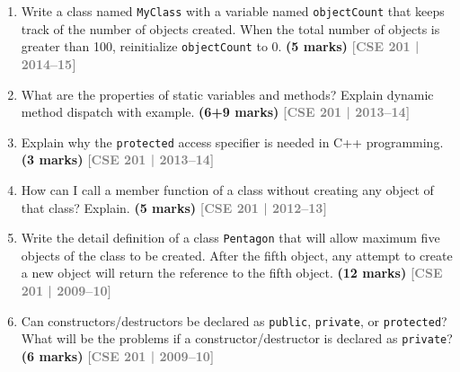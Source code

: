 \documentclass[12pt,a3paper]{article}
\newcommand{\yr}[1]{\hfill\textcolor{gray}{\small\textbf{[#1]}}}
\newcommand{\mk}[1]{\textcolor{orange!70!black}{\small\textbf{(#1 marks)}}}
\begin{document}
\begin{enumerate}



\item Write a class named \texttt{MyClass} with a variable named \texttt{objectCount} that keeps track of the number of objects created. When the total number of objects is greater than 100, reinitialize \texttt{objectCount} to 0. \mk{5}
\yr{CSE 201 | 2014--15}




\item What are the properties of static variables and methods? Explain dynamic method dispatch with example. \mk{6+9}
\yr{CSE 201 | 2013--14}




\item Explain why the \texttt{protected} access specifier is needed in C++ programming. \mk{3}
\yr{CSE 201 | 2013--14}




\item How can I call a member function of a class without creating any object of that class? Explain. \mk{5}
\yr{CSE 201 | 2012--13}




\item Write the detail definition of a class \texttt{Pentagon} that will allow maximum five objects of the class to be created. After the fifth object, any attempt to create a new object will return the reference to the fifth object. \mk{12}
\yr{CSE 201 | 2009--10}




\item Can constructors/destructors be declared as \texttt{public}, \texttt{private}, or \texttt{protected}? What will be the problems if a constructor/destructor is declared as \texttt{private}? \mk{6}
\yr{CSE 201 | 2009--10}





\end{enumerate}
\end{document}
